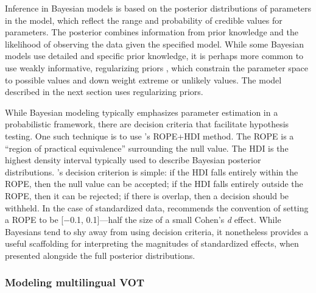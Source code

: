 Inference in Bayesian models is based on the posterior distributions of parameters in the model, which reflect the range and probability of credible values for parameters. The posterior combines information from prior knowledge and the likelihood of observing the data given the specified model. While some Bayesian models use detailed and specific prior knowledge, it is perhaps more common to use weakly informative, regularizing priors \citep{gelman_2017_prior}, which constrain the parameter space to possible values and down weight extreme or unlikely values. The model described in the next section uses regularizing priors. 

While Bayesian modeling typically emphasizes parameter estimation in a probabilistic framework, there are decision criteria that facilitate hypothesis testing. One such technique is to use \citeauthor{kruschke_2011_rope}'s \citeyearpar{kruschke_2011_rope} ROPE+HDI method. The ROPE is a ``region of practical equivalence'' surrounding the null value. The HDI is the highest density interval typically used to describe Bayesian posterior distributions. \citeauthor{kruschke_2011_rope}'s \citeyearpar{kruschke_2011_rope} decision criterion is simple: if the HDI falls entirely within the ROPE, then the null value can be accepted; if the HDI falls entirely outside the ROPE, then it can be rejected; if there is overlap, then a decision should be withheld. In the case of standardized data, \citet{kruschke_2011_rope} recommends the convention of setting a ROPE to be [$-$0.1, 0.1]---half the size of a small Cohen's \textit{d} effect. While Bayesians tend to shy away from using decision criteria, it nonetheless provides a useful scaffolding for interpreting the magnitudes of standardized effects, when presented alongside the full posterior distributions. 


\subsubsection{Modeling multilingual VOT}\label{ch4:sec:model}

